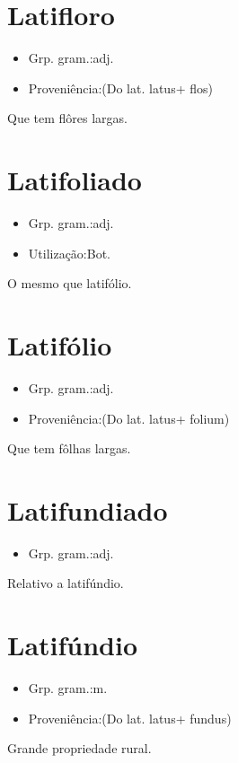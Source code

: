 \section{Latifloro}
\begin{itemize}
\item {Grp. gram.:adj.}
\end{itemize}
\begin{itemize}
\item {Proveniência:(Do lat. \textunderscore latus\textunderscore  + \textunderscore flos\textunderscore )}
\end{itemize}
Que tem flôres largas.
\section{Latifoliado}
\begin{itemize}
\item {Grp. gram.:adj.}
\end{itemize}
\begin{itemize}
\item {Utilização:Bot.}
\end{itemize}
O mesmo que \textunderscore latifólio\textunderscore .
\section{Latifólio}
\begin{itemize}
\item {Grp. gram.:adj.}
\end{itemize}
\begin{itemize}
\item {Proveniência:(Do lat. \textunderscore latus\textunderscore  + \textunderscore folium\textunderscore )}
\end{itemize}
Que tem fôlhas largas.
\section{Latifundiado}
\begin{itemize}
\item {Grp. gram.:adj.}
\end{itemize}
Relativo a latifúndio.
\section{Latifúndio}
\begin{itemize}
\item {Grp. gram.:m.}
\end{itemize}
\begin{itemize}
\item {Proveniência:(Do lat. \textunderscore latus\textunderscore  + \textunderscore fundus\textunderscore )}
\end{itemize}
Grande propriedade rural.
